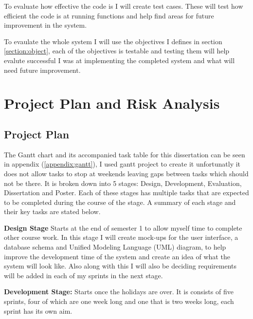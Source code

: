 \documentclass[12pt]{article}  %
\begin{document}
To evaluate how effective the code is I will create test cases. These will test how efficient the code is at running functions and help find areas for future improvement in the system.

To evaulate the whole system I will use the objectives I defines in section \ref{section:object}, each of the objectives is testable and testing them will help evalute successful I was at implementing the completed system and what will need future improvement.





\newpage
\section{Project Plan and Risk Analysis}


\subsection{Project Plan}


The Gantt chart and its accompanied task table for this dissertation can be seen in appendix (\ref{appendix:gantt}), I used gantt project to create it unfortunatly it does not allow tasks to stop at weekends leaving gaps between tasks which should not be there. It is broken down into 5 stages: Design, Development, Evaluation, Dissertation and Poster. Each of these stages has multiple tasks that are expected to be completed during the course of the stage. A summary of each stage and their key tasks are stated below.\bigskip

\noindent
\textbf{Design Stage} Starts at the end of semester 1 to allow myself time to complete other course work. In this stage I will create mock-ups for the user interface, a database schema and Unified Modeling Language (UML) diagram, to help improve the development time of the system and create an idea of what the system will look like. Also along with this I will also be deciding requirements will be added in each of my sprints in the next stage.\bigskip

\noindent
\textbf{Development Stage:} Starts once the holidays are over. It is consists of five sprints, four of which are one week long and one that is two weeks long, each sprint has its own aim. 
\end{document}
